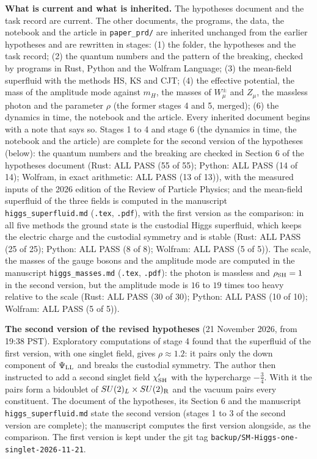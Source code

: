 \documentclass[
  10pt,
]{article}
\begin{document}
\textbf{What is current and what is inherited.} The hypotheses document
and the task record are current. The other documents, the programs, the
data, the notebook and the article in \texttt{paper\_prd/} are inherited
unchanged from the earlier hypotheses and are rewritten in stages: (1)
the folder, the hypotheses and the task record; (2) the quantum numbers
and the pattern of the breaking, checked by programs in Rust, Python and
the Wolfram Language; (3) the mean-field superfluid with the methods HS,
KS and CJT; (4) the effective potential, the mass of the amplitude mode
against \(m_H\), the masses of \(W^\pm_\mu\) and \(Z_\mu\), the massless
photon and the parameter \(\rho\) (the former stages 4 and 5, merged);
(6) the dynamics in time, the notebook and the article. Every inherited
document begins with a note that says so. Stages 1 to 4 and stage 6 (the
dynamics in time, the notebook and the article) are complete for the
second version of the hypotheses (below): the quantum numbers and the
breaking are checked in Section 6 of the hypotheses document (Rust: ALL
PASS (55 of 55); Python: ALL PASS (14 of 14); Wolfram, in exact
arithmetic: ALL PASS (13 of 13)), with the measured inputs of the 2026
edition of the Review of Particle Physics; and the mean-field superfluid
of the three fields is computed in the manuscript
\texttt{higgs\_superfluid.md} (\texttt{.tex}, \texttt{.pdf}), with the
first version as the comparison: in all five methods the ground state is
the custodial Higgs superfluid, which keeps the electric charge and the
custodial symmetry and is stable (Rust: ALL PASS (25 of 25); Python: ALL
PASS (8 of 8); Wolfram: ALL PASS (5 of 5)). The scale, the masses of the
gauge bosons and the amplitude mode are computed in the manuscript
\texttt{higgs\_masses.md} (\texttt{.tex}, \texttt{.pdf}): the photon is
massless and \(\rho_{\rm SH}=1\) in the second version, but the
amplitude mode is \(16\) to \(19\) times too heavy relative to the scale
(Rust: ALL PASS (30 of 30); Python: ALL PASS (10 of 10); Wolfram: ALL
PASS (5 of 5)).

\textbf{The second version of the revised hypotheses} (21 November 2026,
from 19:38 PST). Exploratory computations of stage 4 found that the
superfluid of the first version, with one singlet field, gives
\(\rho\approx1.2\): it pairs only the down component of
\(\Psi_{\rm LL}\) and breaks the custodial symmetry. The author then
instructed to add a second singlet field \(\chi'_{\rm SH}\) with the
hypercharge \(-\tfrac34\). With it the pairs form a bidoublet of
\(SU(2)_L\times SU(2)_{\rm R}\) and the vacuum pairs every constituent.
The document of the hypotheses, its Section 6 and the manuscript
\texttt{higgs\_superfluid.md} state the second version (stages 1 to 3 of
the second version are complete); the manuscript computes the first
version alongside, as the comparison. The first version is kept under
the git tag \texttt{backup/SM-Higgs-one-singlet-2026-11-21}.
\end{document}
